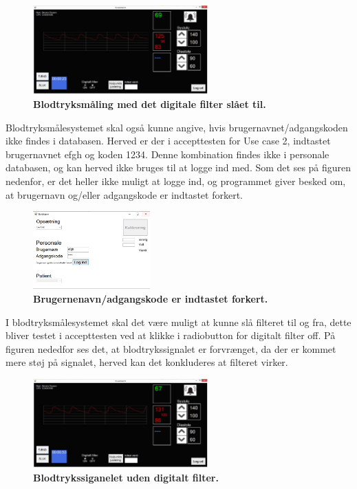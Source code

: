 \begin{figure}[H]
\includegraphics[width =0.6\textwidth , center]{billeder/IThovedGUIkorer}
\caption{\textbf{Blodtryksmåling med det digitale filter slået til.}}
\end{figure}
Blodtryksmålesystemet skal også kunne angive, hvis brugernavnet/adgangskoden ikke findes i databasen. Herved er der i accepttesten for Use case 2, indtastet brugernavnet efgh og koden 1234. Denne kombination findes ikke i personale databasen, og kan herved ikke bruges til at logge ind med. Som det ses på figuren nedenfor, er det heller ikke muligt at logge ind, og programmet giver besked om, at brugernavn og/eller adgangskode er indtastet forkert.
\begin{figure}[H]
\includegraphics[width =0.4\textwidth , center]{billeder/ITstartGUIforkert}
\caption{\textbf{Brugernenavn/adgangskode er indtastet forkert.}}
\end{figure}
I blodtryksmålesystemet skal det være muligt at kunne slå filteret til og fra, dette bliver testet i accepttesten ved at klikke i radiobutton for digitalt filter off. På figuren nededfor ses det, at blodtrykssignalet er forvrænget, da der er kommet mere støj på signalet, herved kan det konkluderes at filteret virker. 
\begin{figure}[H]
\includegraphics[width =0.6\textwidth , center]{billeder/IThovedGUIkorerufiltreret}
\caption{\textbf{Blodtrykssiganelet uden digitalt filter.}}
\end{figure}
